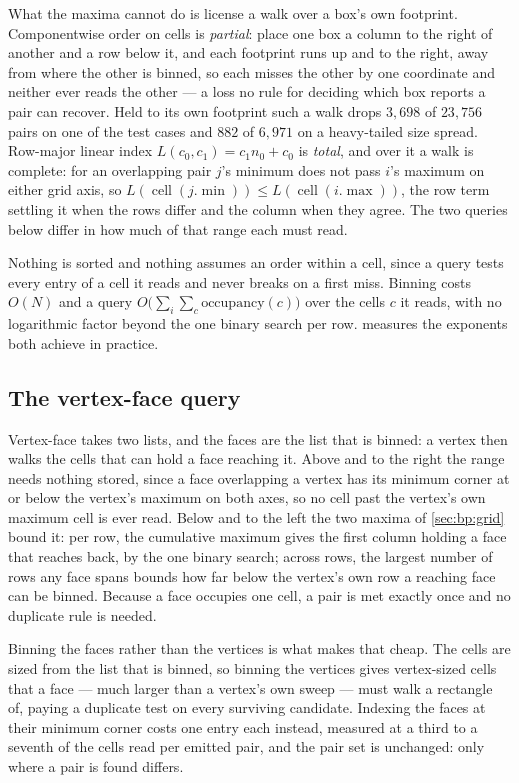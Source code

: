 What the maxima cannot do is license a walk over a box's own footprint.
Componentwise order on cells is \emph{partial}: place one box a column to the
right of another and a row below it, and each footprint runs up and to the right,
away from where the other is binned, so each misses the other by one coordinate
and neither ever reads the other --- a loss no rule for deciding which box
reports a pair can recover. Held to its own footprint such a walk drops
$3{,}698$ of $23{,}756$ pairs on one of the test cases and $882$ of $6{,}971$ on
a heavy-tailed size spread. Row-major linear index $L(c_{0},c_{1}) = c_{1}n_{0} +
c_{0}$ is \emph{total}, and over it a walk is complete: for an overlapping pair
$j$'s minimum does not pass $i$'s maximum on either grid axis, so
$L(\operatorname{cell}(j.\min)) \le L(\operatorname{cell}(i.\max))$, the row term
settling it when the rows differ and the column when they agree. The two queries
below differ in how much of that range each must read.

Nothing is sorted and nothing assumes an order within a cell, since a query
tests every entry of a cell it reads and never breaks on a first miss. Binning
costs $O(N)$ and a query $O\bigl(\sum_{i}\sum_{c}\text{occupancy}(c)\bigr)$ over
the cells $c$ it reads, with no logarithmic factor beyond the one binary search
per row.  measures the exponents both achieve in
practice.

\subsection{The vertex-face query}
\label{sec:bp:cell}

Vertex-face takes two lists, and the faces are the list that is binned: a vertex
then walks the cells that can hold a face reaching it. Above and to the right the
range needs nothing stored, since a face overlapping a vertex has its minimum
corner at or below the vertex's maximum on both axes, so no cell past the
vertex's own maximum cell is ever read. Below and to the left the two maxima of
\cref{sec:bp:grid} bound it: per row, the cumulative maximum gives the first
column holding a face that reaches back, by the one binary search; across rows,
the largest number of rows any face spans bounds how far below the vertex's own
row a reaching face can be binned. Because a face occupies one cell, a pair is
met exactly once and no duplicate rule is needed.

Binning the faces rather than the vertices is what makes that cheap. The cells
are sized from the list that is binned, so binning the vertices gives
vertex-sized cells that a face --- much larger than a vertex's own sweep ---
must walk a rectangle of, paying a duplicate test on every surviving candidate.
Indexing the faces at their minimum corner costs one entry each instead,
measured at a third to a seventh of the cells read per emitted pair, and the pair
set is unchanged: only where a pair is found differs.

